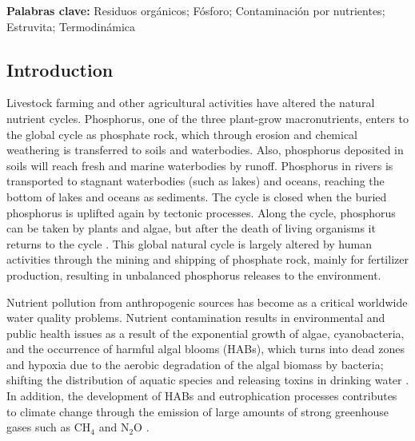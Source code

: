\medskip
\textbf{Palabras clave:} Residuos orgánicos; Fósforo; Contaminación por nutrientes; Estruvita; Termodinámica

\newpage

\begin{refsection}[referencesCh3]
\section{Introduction}
Livestock farming and other agricultural activities have altered the natural nutrient cycles. Phosphorus, one of the three plant-grow macronutrients, enters to the global cycle as phosphate rock, which through erosion and chemical weathering is transferred to soils and waterbodies. Also, phosphorus deposited in soils will reach fresh and marine waterbodies by runoff. Phosphorus in rivers is transported to stagnant waterbodies (such as lakes) and oceans, reaching the bottom of lakes and oceans as sediments. The cycle is closed when the buried phosphorus is uplifted again by tectonic processes. Along the cycle, phosphorus can be taken by plants and algae, but after the death of living organisms it returns to the cycle \citep{RUTTENBERG2001401}. This global natural cycle is largely altered by human activities through the mining and shipping of phosphate rock, mainly for fertilizer production, resulting in unbalanced phosphorus releases to the environment.

Nutrient pollution from anthropogenic sources has become as a critical worldwide water quality problems. Nutrient contamination results in environmental and public health issues as a result of the exponential growth of algae, cyanobacteria, and the occurrence of harmful algal blooms (HABs), which turns into dead zones and hypoxia due to the aerobic degradation of the algal biomass by bacteria; shifting the distribution of aquatic species and releasing toxins in drinking water \citep{Sampat2}. In addition, the development of HABs and eutrophication processes contributes to climate change through the emission of large amounts of strong greenhouse gases such as $\text{CH}_{4}$ and $\text{N}_{2}\text{O}$ \citep{Beaulieu}.


\end{refsection}
